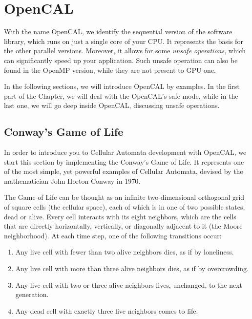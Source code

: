 \chapter{OpenCAL}

With the name OpenCAL, we identify the sequential version of the
software library, which runs on just a single core of your CPU. It
represents the basis for the other parallel versions. Moreover, it
allows for some \emph{unsafe operations}, which can significantly speed up
your application. Such unsafe operation can also be found in the
OpenMP version, while they are not present to GPU one.

In the following sections, we will introduce OpenCAL by examples. In
the first part of the Chapter, we will deal with the OpenCAL's safe
mode, while in the last one, we will go deep inside OpenCAL,
discussing unsafe operations.

\section{Conway's Game of Life}

In order to introduce you to Cellular Automata development with
OpenCAL, we start this section by implementing the Conway's Game of
Life. It represents one of the most simple, yet powerful examples of
Cellular Automata, devised by the mathematician John Horton Conway in
1970.

The Game of Life can be thought as an infinite two-dimensional
orthogonal grid of square cells (the cellular space), each of which is
in one of two possible states, dead or alive. Every cell interacts
with its eight neighbors, which are the cells that are directly
horizontally, vertically, or diagonally adjacent to it (the Moore
neighborhood). At each time step, one of the following transitions
occur:

\begin{enumerate}
    \item Any live cell with fewer than two alive neighbors dies, as
      if by loneliness.
    \item Any live cell with more than three alive neighbors dies, as
      if by overcrowding.
    \item Any live cell with two or three alive neighbors lives,
      unchanged, to the next generation.
    \item Any dead cell with exactly three live neighbors comes to
      life.
\end{enumerate}

